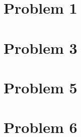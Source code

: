 \documentclass{tron}
\begin{document}
\newpage
\appendix
\begin{appendices}
\section{Problem 1}


\section{Problem 3}


\section{Problem 5}


\section{Problem 6}


%


\end{appendices}
\end{document}
